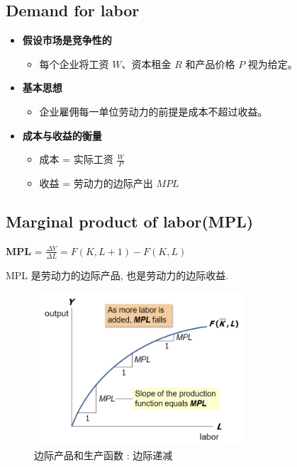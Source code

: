 \subsection{Demand for labor}
\begin{itemize}
    \item \textbf{假设市场是竞争性的}
    \begin{itemize}
        \item 每个企业将工资 $ W $、资本租金 $ R $ 和产品价格 $P $ 视为给定。
    \end{itemize}
    \item \textbf{基本思想}   
\begin{itemize}
        \item 企业雇佣每一单位劳动力的前提是成本不超过收益。
    \end{itemize}
    \item \textbf{成本与收益的衡量}
\begin{itemize}
        \item 成本 = 实际工资 $ \frac{W}{P} $
        \item 收益 = 劳动力的边际产出 $ MPL $
    \end{itemize}
\end{itemize}

\subsection{Marginal product of labor(MPL)}
\begin{definition}
    \textbf{MPL} = $\frac{\Delta Y}{\Delta L} = F(K,L+1)-F(K,L)$
\end{definition}
\begin{note}
    MPL 是劳动力的边际产品, 也是劳动力的边际收益.
\end{note}

\begin{figure}[htbp]
    \centering
    \includegraphics[width=0.7\textwidth]{image/MPLpf.png}
    \caption{边际产品和生产函数 : 边际递减}
\end{figure}


